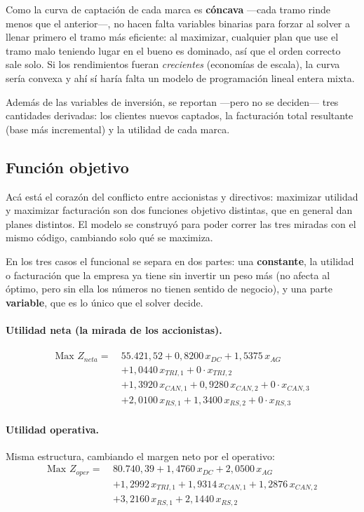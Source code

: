 \documentclass[10pt,a4paper]{article}
\begin{document}
Como la curva de captación de cada marca es \textbf{cóncava} —cada tramo rinde
menos que el anterior—, no hacen falta variables binarias para forzar al
solver a llenar primero el tramo más eficiente: al maximizar, cualquier plan
que use el tramo malo teniendo lugar en el bueno es dominado, así que el orden
correcto sale solo. Si los rendimientos fueran \emph{crecientes} (economías de
escala), la curva sería convexa y ahí sí haría falta un modelo de programación
lineal entera mixta.

Además de las variables de inversión, se reportan —pero no se deciden—
tres cantidades derivadas: los clientes nuevos captados, la facturación total
resultante (base más incremental) y la utilidad de cada marca.

\subsection{Función objetivo}
\label{sec:objetivo}

Acá está el corazón del conflicto entre accionistas y directivos: maximizar
utilidad y maximizar facturación son dos funciones objetivo distintas, que en
general dan planes distintos. El modelo se construyó para poder correr las
tres miradas con el mismo código, cambiando solo qué se maximiza.

En los tres casos el funcional se separa en dos partes: una \textbf{constante},
la utilidad o facturación que la empresa ya tiene sin invertir un peso más
(no afecta al óptimo, pero sin ella los números no tienen sentido de negocio),
y una parte \textbf{variable}, que es lo único que el solver decide.

\paragraph{Utilidad neta (la mirada de los accionistas).}
\[
\begin{aligned}
\text{Max } Z_{neta} = \ & 55.421{,}52
+ 0{,}8200\,x_{DC} + 1{,}5375\,x_{AG} \\
& + 1{,}0440\,x_{TRI,1} + 0\cdot x_{TRI,2} \\
& + 1{,}3920\,x_{CAN,1} + 0{,}9280\,x_{CAN,2} + 0\cdot x_{CAN,3}\\
& + 2{,}0100\,x_{RS,1} + 1{,}3400\,x_{RS,2} + 0\cdot x_{RS,3}
\end{aligned}
\]

\paragraph{Utilidad operativa.} Misma estructura, cambiando el margen neto por
el operativo:
\[
\begin{aligned}
\text{Max } Z_{oper} = \ & 80.740{,}39
+ 1{,}4760\,x_{DC} + 2{,}0500\,x_{AG} \\
& + 1{,}2992\,x_{TRI,1} + 1{,}9314\,x_{CAN,1} + 1{,}2876\,x_{CAN,2} \\
& + 3{,}2160\,x_{RS,1} + 2{,}1440\,x_{RS,2}
\end{aligned}
\]
\end{document}
